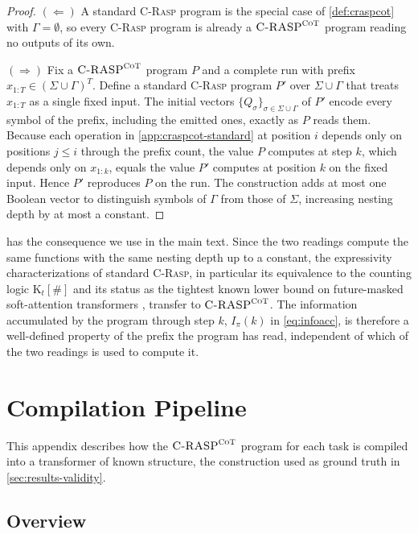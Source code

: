\documentclass[11pt]{article}
\newcommand{\stepk}{k}
\newcommand{\CRASPCoT}{\textsc{C-RASP}^{\textsc{CoT}}}
\begin{document}
\begin{proof}
$(\Leftarrow)$ A standard \textsc{C-Rasp} program is the special case of
\cref{def:craspcot} with $\Gamma=\emptyset$, so every \textsc{C-Rasp} program is
already a $\CRASPCoT$ program reading no outputs of its own.

$(\Rightarrow)$ Fix a $\CRASPCoT$ program $P$ and a complete run with prefix
$x_{1{:}T}\in(\Sigma\cup\Gamma)^{T}$. Define a standard \textsc{C-Rasp} program
$P'$ over $\Sigma\cup\Gamma$ that treats $x_{1{:}T}$ as a single fixed input.
The initial vectors $\{Q_{\sigma}\}_{\sigma\in\Sigma\cup\Gamma}$ of $P'$ encode
every symbol of the prefix, including the emitted ones, exactly as $P$ reads
them. Because each operation in \cref{app:craspcot-standard} at position $i$
depends only on positions $j\le i$ through the prefix count, the value $P$
computes at step $\stepk$, which depends only on $x_{1{:}\stepk}$, equals the
value $P'$ computes at position $\stepk$ on the fixed input. Hence $P'$
reproduces $P$ on the run. The construction adds at most one Boolean vector to
distinguish symbols of $\Gamma$ from those of $\Sigma$, increasing nesting depth
by at most a constant.
\end{proof}

 has the consequence we use in the main text. Since the
two readings compute the same functions with the same nesting depth up to a
constant, the expressivity characterizations of standard \textsc{C-Rasp}, in
particular its equivalence to the counting logic $\mathrm{K}_{t}[\#]$ and its
status as the tightest known lower bound on future-masked soft-attention
transformers \citep{DBLP:journals/corr/abs-2404-04393}, transfer to
$\CRASPCoT$. The information accumulated by the program through step $\stepk$,
$I_{\pi}(\stepk)$ in \cref{eq:infoacc}, is therefore a well-defined property of
the prefix the program has read, independent of which of the two readings is
used to compute it.

\section{Compilation Pipeline}
\label{app:compile}

This appendix describes how the $\CRASPCoT$ program for each task is compiled
into a transformer of known structure, the construction used as ground truth in
\cref{sec:results-validity}.

\subsection{Overview}
\label{app:compile-overview}
\end{document}
